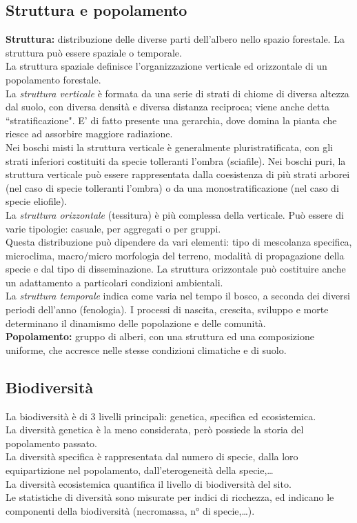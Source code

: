 \documentclass{article}
\begin{document}
\subsection{Struttura e popolamento}
\textbf{Struttura:} distribuzione delle diverse parti dell'albero nello spazio forestale. La struttura può essere spaziale o temporale.\\
La struttura spaziale definisce l'organizzazione verticale ed orizzontale di un popolamento forestale.\\
La \textit{struttura verticale} è formata da una serie di strati di chiome di diversa altezza dal suolo, con diversa densità e diversa distanza reciproca; viene anche detta ``stratificazione". E' di fatto presente una gerarchia, dove domina la pianta che riesce ad assorbire maggiore radiazione.\\
Nei boschi misti la struttura verticale è generalmente pluristratificata, con gli strati inferiori costituiti da specie tolleranti l'ombra (sciafile). Nei boschi puri, la struttura verticale può essere rappresentata dalla coesistenza di più strati arborei (nel caso di specie tolleranti l'ombra) o da una monostratificazione (nel caso di specie eliofile).\\
La \textit{struttura orizzontale} (tessitura) è più complessa della verticale. Può essere di varie tipologie: casuale, per aggregati o per gruppi.\\
Questa distribuzione può dipendere da vari elementi: tipo di mescolanza specifica, microclima, macro/micro morfologia del terreno, modalità di propagazione della specie e dal tipo di disseminazione. La struttura orizzontale può costituire anche un adattamento a particolari condizioni ambientali.\\
La \textit{struttura temporale} indica come varia nel tempo il bosco, a seconda dei diversi periodi dell'anno (fenologia).
I processi di nascita, crescita, sviluppo e morte determinano il dinamismo delle popolazione e delle comunità.\\
\textbf{Popolamento:} gruppo di alberi, con una struttura ed una composizione uniforme, che accresce nelle stesse condizioni climatiche e di suolo.\\

\subsection{Biodiversità}
La biodiversità è di 3 livelli principali: genetica, specifica ed ecosistemica.\\
La diversità genetica è la meno considerata, però possiede la storia del popolamento passato.\\
La diversità specifica è rappresentata dal numero di specie, dalla loro equipartizione nel popolamento, dall'eterogeneità della specie,\dots\\
La diversità ecosistemica quantifica il livello di biodiversità del sito.\\
Le statistiche di diversità sono misurate per indici di ricchezza, ed indicano le componenti della biodiversità (necromassa, n° di specie,\dots).
\end{document}
